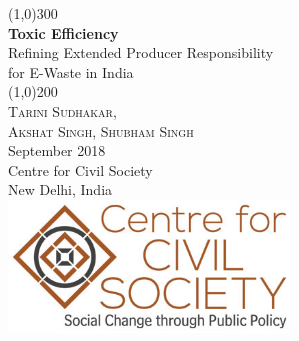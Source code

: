 \documentclass[a4paper, 12pt]{article}
\begin{document}
                    
                    \begin{titlepage}
                    	\begin{center}
                    	\line(1,0){300}\\
                    	[0.25in]
                    	\huge{\bfseries \textcolor{CCSbrown} {Toxic Efficiency}} \\
    	[0.5cm]
    	\large  {Refining Extended Producer Responsibility \\ for E-Waste in India} \\
    	
                    	\line(1,0){200}\\
                    	[1in]
                    	\textsc{\huge Tarini Sudhakar, \\ Akshat Singh, Shubham Singh} \\
                    	[1.5cm]
                    	{\Large September 2018} \\
                    	[2.0cm]
                    	{\LARGE Centre for Civil Society} \\
                    	[0.1mm]
                    	{\Large New Delhi, India} \\
    	[2.0cm]
    	 \includegraphics[width = 75mm]{CCSlogo.jpg}
      
                    	\end{center}
                    \end{titlepage}
                    \tableofcontents
                    
                   \newpage
         
\end{document}

